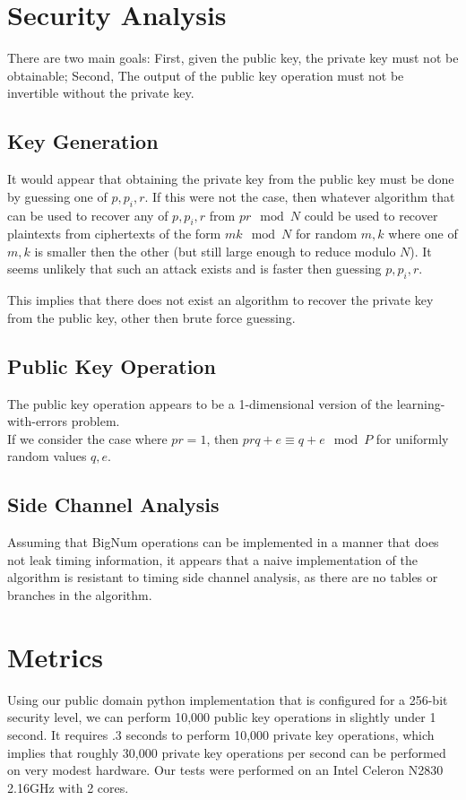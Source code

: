 \documentclass[preprint]{iacrtrans}
\begin{document}
\section{Security Analysis}
There are two main goals: First, given the public key, the private key must not be obtainable; Second, The output of the public key operation must not be invertible without the private key.

\subsection{Key Generation}
It would appear that obtaining the private key from the public key must be done by guessing one of $p, p_i, r$. If this were not the case, then whatever algorithm that can be used to recover any of $p, p_i, r$ from $p r \mod N$ could be used to recover plaintexts from ciphertexts of the form $m k \mod N$ for random $m, k$ where one of $m, k$ is smaller then the other (but still large enough to reduce modulo $N$). It seems unlikely that such an attack exists and is faster then guessing $p, p_i,  r$. 

This implies that there does not exist an algorithm to recover the private key from the public key, other then brute force guessing.

\subsection{Public Key Operation}
The public key operation appears to be a 1-dimensional version of the learning-with-errors problem.\\

If we consider the case where $pr = 1$, then $prq + e \equiv q + e \mod P$ for uniformly random values $q, e$. 

\subsection{Side Channel Analysis}
Assuming that BigNum operations can be implemented in a manner that does not leak timing information, it appears that a naive implementation of the algorithm is resistant to timing side channel analysis, as there are no tables or branches in the algorithm.

\section{Metrics}
Using our public domain python implementation that is configured for a 256-bit security level, we can perform 10,000 public key operations in slightly under 1 second. It requires .3 seconds to perform 10,000 private key operations, which implies that roughly 30,000 private key operations per second can be performed on very modest hardware. Our tests were performed on an Intel Celeron N2830 2.16GHz with 2 cores. 
\end{document}
